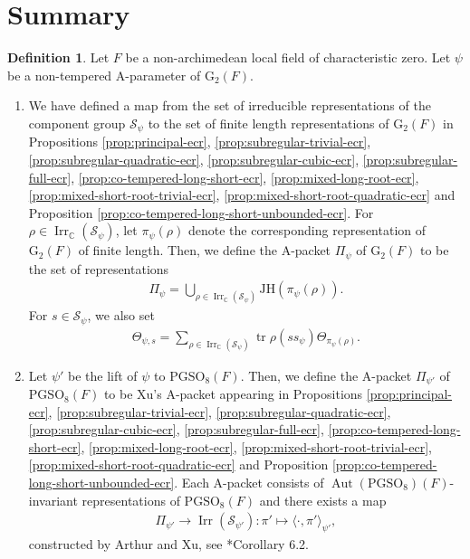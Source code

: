\documentclass[12pt]{amsart}
\theoremstyle{definition}
\newtheorem{definition}{Definition}[section]
\theoremstyle{plain}
\theoremstyle{remark}
\def\C{\mathbb{C}}%
\def\PGSO{\mathrm{PGSO}}
\DeclareMathOperator{\Aut}{Aut}%
\DeclareMathOperator{\Irr}{Irr}%
\DeclareMathOperator{\tr}{tr}%
\newcommand{\cS}{\mathcal{S}}
\numberwithin{equation}{section}
\newcommand{\rG}{\mathrm{G}}
\begin{document}
\section{Summary}\label{sec:summary}

\begin{definition}
      Let $F$ be a non-archimedean local field of characteristic zero.  
      Let $\psi$ be a non-tempered A-parameter of $\rG_2(F)$.
      \begin{enumerate}
            \item 
            We have defined a map from the set of irreducible representations of the component group $\cS_{\psi}$ to the set of finite length representations of $\rG_2(F)$
            in Propositions \ref{prop:principal-ecr}, \ref{prop:subregular-trivial-ecr}, \ref{prop:subregular-quadratic-ecr}, \ref{prop:subregular-cubic-ecr}, \ref{prop:subregular-full-ecr}, \ref{prop:co-tempered-long-short-ecr}, \ref{prop:mixed-long-root-ecr}, \ref{prop:mixed-short-root-trivial-ecr}, \ref{prop:mixed-short-root-quadratic-ecr} and Proposition \ref{prop:co-tempered-long-short-unbounded-ecr}.
            For $\rho \in \Irr_{\C}(\cS_{\psi})$, let $\pi_{\psi}(\rho)$ denote the corresponding representation of $\rG_2(F)$ of finite length.
            Then, we define the A-packet $\Pi_{\psi}$ of $\rG_2(F)$ to be the set of representations
            \begin{align*}
                  \Pi_{\psi} = \bigcup_{\rho \in \Irr_{\C}(\cS_{\psi})} \mathrm{JH}(\pi_{\psi}(\rho)).
            \end{align*}
            For $s \in \cS_{\psi}$, we also set 
            \begin{align*}
                  \Theta_{\psi, s} = \sum_{\rho \in \Irr_{\C}(\cS_{\psi})} \tr\rho (s s_{\psi}) \Theta_{\pi_{\psi}(\rho)}.
            \end{align*}
            \item 
            Let $\psi'$ be the lift of $\psi$ to $\PGSO_8(F)$.
            Then, we define the A-packet $\Pi_{\psi'}$ of $\PGSO_8(F)$ to be Xu's A-packet appearing in Propositions \ref{prop:principal-ecr}, \ref{prop:subregular-trivial-ecr}, \ref{prop:subregular-quadratic-ecr}, \ref{prop:subregular-cubic-ecr}, \ref{prop:subregular-full-ecr}, \ref{prop:co-tempered-long-short-ecr}, \ref{prop:mixed-long-root-ecr}, \ref{prop:mixed-short-root-trivial-ecr}, \ref{prop:mixed-short-root-quadratic-ecr} and Proposition \ref{prop:co-tempered-long-short-unbounded-ecr}.
            Each A-packet consists of $\Aut(\PGSO_8)(F)$-invariant representations of $\PGSO_8(F)$ and there exists a map
            \begin{align*}
                  \Pi_{\psi'} \to \Irr(\cS_{\psi'}) \colon \pi' \mapsto \langle \cdot, \pi' \rangle_{\psi'},
            \end{align*}
            constructed by Arthur and Xu, see \cite{Xu2024-ArthurPacketsQuasisplitGSp2nGO2n}*{Corollary 6.2}.
      \end{enumerate}
\end{definition}
\end{document}
